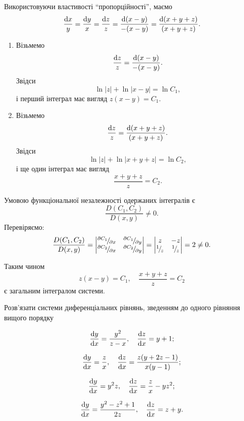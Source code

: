 \begin{solution}
	Використовуючи властивості ``пропорційності'', маємо \[ \frac{\mathop{}\!\mathrm{d} x}{y} = \frac{\mathop{}\!\mathrm{d} y}{x} = \frac{\mathop{}\!\mathrm{d} z}{z} = \frac{\mathop{}\!\mathrm{d} (x - y)}{-(x - y)} = \frac{\mathop{}\!\mathrm{d} (x + y + z)}{(x + y + z)}. \]

	\begin{enumerate}
		\item Візьмемо \[\frac{\mathop{}\!\mathrm{d} z}{z} = \frac{\mathop{}\!\mathrm{d} (x - y)}{-(x - y)}.\] Звідси \[\ln |z| + \ln |x - y| = \ln C_1,\] і перший інтеграл має вигляд $z (x - y) = C_1$.
		\item Візьмемо \[\frac{\mathop{}\!\mathrm{d} z}{z} = \frac{\mathop{}\!\mathrm{d} (x + y + z)}{(x + y + z)}.\] Звідси \[\ln |z| + \ln |x + y + z| = \ln C_2,\] і ще один інтеграл має вигляд \[\frac{x + y + z}{z} = C_2.\]
	\end{enumerate}

	Умовою функціональної незалежності одержаних інтегралів є \[\frac{D(C_1, C_2)}{D(x, y)} \ne 0.\] Перевіряємо: \[ \frac{D(C_1, C_2)}{D(x, y)} = \begin{vmatrix} \rfrac{\partial C_1}{\partial x} & \rfrac{\partial C_1}{\partial y} \\ \rfrac{\partial C_2}{\partial x} & \rfrac{\partial C_2}{\partial y} \end{vmatrix} = \begin{vmatrix} z & -z \\ \rfrac{1}{z} & \rfrac{1}{z} \end{vmatrix} = 2 \ne 0. \]
	
	Таким чином \[ z (x - y) = C_1, \quad \frac{x + y + z}{z} = C_2 \] є загальним інтегралом системи.
\end{solution}

Розв'язати системи диференціальних рівнянь, зведенням до одного рівняння вищого порядку

\begin{multicols}{2}
\begin{problem}
	\[ \frac{\mathop{}\!\mathrm{d} y}{\mathop{}\!\mathrm{d} x} = \frac{y^2}{z - x}, \quad \frac{\mathop{}\!\mathrm{d} z}{\mathop{}\!\mathrm{d} x} = y + 1; \]
\end{problem}
\begin{problem}
	\[ \frac{\mathop{}\!\mathrm{d} y}{\mathop{}\!\mathrm{d} x} = \frac{z}{x}, \quad \frac{\mathop{}\!\mathrm{d} z}{\mathop{}\!\mathrm{d} x} = \frac{z (y + 2 z - 1)}{x (y - 1)}; \]
\end{problem}
\begin{problem}
	\[ \frac{\mathop{}\!\mathrm{d} y}{\mathop{}\!\mathrm{d} x} = y^2 z, \quad \frac{\mathop{}\!\mathrm{d} z}{\mathop{}\!\mathrm{d} x} = \frac{z}{x} - y z^2; \]
\end{problem}
\begin{problem}
	\[ \frac{\mathop{}\!\mathrm{d} y}{\mathop{}\!\mathrm{d} x} = \frac{y^2 - z^2 + 1}{2 z}, \quad \frac{\mathop{}\!\mathrm{d} z}{\mathop{}\!\mathrm{d} x} = z + y. \]
\end{problem}
\end{multicols}

